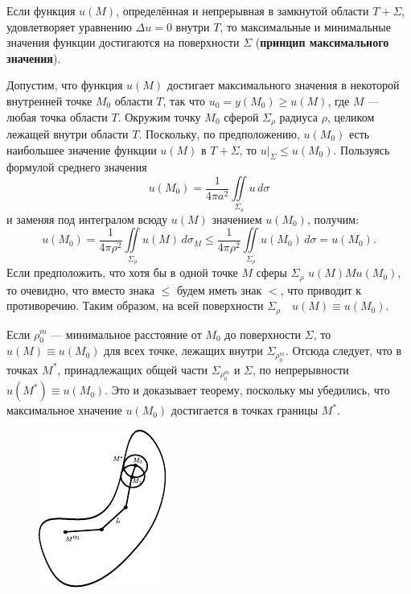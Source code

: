 \begin{theo}
Если функция $u(M)$, определённая и непрерывная в замкнутой области $T + \Sigma$, удовлетворяет уравнению $\Delta u = 0$ внутри $T$, то максимальные и минимальные значения функции достигаются на поверхности $\Sigma$ (\textbf{принцип максимального значения}).
\end{theo}
\begin{qproof}
Допустим, что функция $u(M)$ достигает максимального значения в некоторой внутренней точке $M_0$ области $T$, так что $u_0 = y(M_0) \geqslant u(M)$, где $M$ --- любая точка области $T$. Окружим точку $M_0$ сферой $\Sigma_\rho$ радиуса $\rho$, целиком лежащей внутри области $T$. Поскольку, по предположению, $u(M_0)$ есть наибольшее значение функции $u(M)$ в $T + \Sigma$, то $u|_\Sigma \leqslant u (M_0)$. Пользуясь формулой среднего значения 
\[
	u(M_0) = \frac{1}{4 \pi a^2} \iint\limits_{\Sigma_a} u \, d \sigma
\]
и заменяя под интегралом всюду $u(M)$ значением $u(M_0)$, получим:
\[
	u(M_0) = \frac{1}{4 \pi \rho^2} \iint\limits_{\Sigma_\rho} u(M)\, d\sigma_M \leqslant \frac{1}{4 \pi \rho^2} \iint\limits_{\Sigma_\rho} u (M_0) \, d \sigma = u(M_0).
\]
Если предположить, что хотя бы в одной точке $M$ сферы $\Sigma_\rho$ $u(M) M u(M_0)$, то очевидно, что вместо знака $\leqslant$ будем иметь знак $<$, что приводит к противоречию. Таким образом, на всей поверхности $\Sigma_\rho \quad u(M) \equiv u(M_0)$.

Если $\rho_0^m$ --- минимальное расстояние от $M_0$ до поверхности $\Sigma$, то $u(M) \equiv u(M_0)$ для всех точке, лежащих внутри $\Sigma_{\rho_0^m}$. Отсюда следует, что в точках $M^*$, принадлежащих общей части $\Sigma_{\rho_0^m}$ и $\Sigma$, по непрерывности $u(M^*) \equiv u(M_0)$. Это и доказывает теорему, поскольку мы убедились, что максимальное хначение $u(M_0)$ достигается в точках границы $M^*$.\\
\begin{figure}[h!]
	\centering
	\includegraphics[scale=1.5]{figLaplaceMax.pdf}
\end{figure}


\end{qproof}
